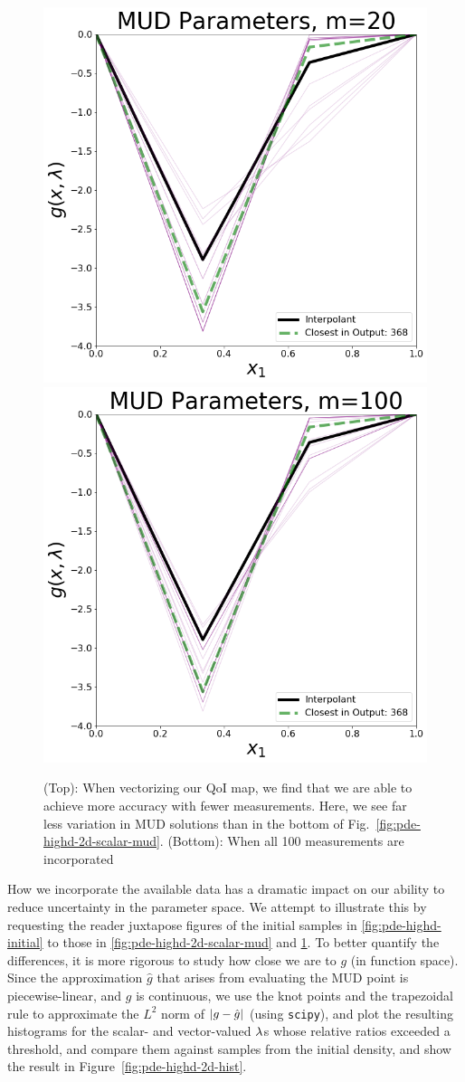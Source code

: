 \begin{figure}[htbp]
\centering
  \includegraphics[width=0.6\linewidth]{figures/pde-highd/pde-highd_pair_D2-2_m20.png}
  \includegraphics[width=0.6\linewidth]{figures/pde-highd/pde-highd_pair_D2-2_m100.png}
\caption{
(Top): When vectorizing our QoI map, we find that we are able to achieve more accuracy with fewer measurements. Here, we see far less variation in MUD solutions than in the bottom of Fig.~\ref{fig:pde-highd-2d-scalar-mud}.
(Bottom): When all 100 measurements are incorporated
}
\label{fig:pde-highd-2d-vector-mud}
\end{figure}

How we incorporate the available data has a dramatic impact on our ability to reduce uncertainty in the parameter space.
We attempt to illustrate this by requesting the reader juxtapose figures of the initial samples in \ref{fig:pde-highd-initial} to those in \ref{fig:pde-highd-2d-scalar-mud} and \ref{fig:pde-highd-2d-vector-mud}.
To better quantify the differences, it is more rigorous to study how close we are to $g$ (in function space).
Since the approximation $\hat{g}$ that arises from evaluating the MUD point is piecewise-linear, and $g$ is continuous, we use the knot points and the trapezoidal rule to approximate the $L^2$ norm of $\left\vert g - \hat{g}\right\vert$ (using {\tt scipy}), and plot the resulting histograms for the scalar- and vector-valued $\lambda$s whose relative ratios exceeded a threshold, and compare them against samples from the initial density, and show the result in Figure~\ref{fig:pde-highd-2d-hist}.


